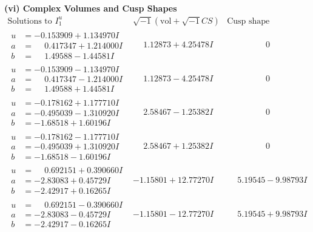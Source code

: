 \documentclass[1p]{elsarticle_modified}
\theoremstyle{definition}
\newcommand{\I}{\sqrt{-1}}
\begin{document}
\newpage\flushleft \textbf{(vi) Complex Volumes and Cusp Shapes}
$$\begin{array}{c|c|c}  
\text{Solutions to }I^u_{1}& \I (\text{vol} + \sqrt{-1}CS) & \text{Cusp shape}\\
 \hline 
\begin{aligned}
u &= -0.153909 + 1.134970 I \\
a &= \phantom{-}0.417347 + 1.214000 I \\
b &= \phantom{-}1.49588 - 1.44581 I\end{aligned}
 & \phantom{-}1.12873 + 4.25478 I & \phantom{-0.000000 } 0 \\ \hline\begin{aligned}
u &= -0.153909 - 1.134970 I \\
a &= \phantom{-}0.417347 - 1.214000 I \\
b &= \phantom{-}1.49588 + 1.44581 I\end{aligned}
 & \phantom{-}1.12873 - 4.25478 I & \phantom{-0.000000 } 0 \\ \hline\begin{aligned}
u &= -0.178162 + 1.177710 I \\
a &= -0.495039 - 1.310920 I \\
b &= -1.68518 + 1.60196 I\end{aligned}
 & \phantom{-}2.58467 - 1.25382 I & \phantom{-0.000000 } 0 \\ \hline\begin{aligned}
u &= -0.178162 - 1.177710 I \\
a &= -0.495039 + 1.310920 I \\
b &= -1.68518 - 1.60196 I\end{aligned}
 & \phantom{-}2.58467 + 1.25382 I & \phantom{-0.000000 } 0 \\ \hline\begin{aligned}
u &= \phantom{-}0.692151 + 0.390660 I \\
a &= -2.83083 + 0.45729 I \\
b &= -2.42917 + 0.16265 I\end{aligned}
 & -1.15801 + 12.77270 I & \phantom{-}5.19545 - 9.98793 I \\ \hline\begin{aligned}
u &= \phantom{-}0.692151 - 0.390660 I \\
a &= -2.83083 - 0.45729 I \\
b &= -2.42917 - 0.16265 I\end{aligned}
 & -1.15801 - 12.77270 I & \phantom{-}5.19545 + 9.98793 I \\ \hline\begin{aligned}

\end{aligned}
\end{array}$$
\end{document}
